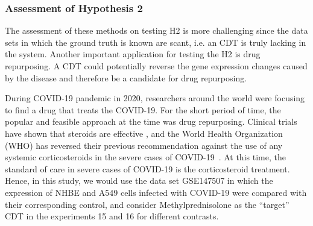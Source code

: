 \subsubsection{Assessment of Hypothesis 2}

The assessment of these methods on testing H2 is more challenging since the data sets in which the ground truth is known are scant, i.e. an CDT is truly lacking in the system. Another important application for testing the H2 is drug repurposing. A CDT could potentially reverse the  gene expression changes caused by the disease and therefore be a candidate for drug repurposing. 


During COVID-19 pandemic in 2020,  researchers around the world were focusing to find a drug that treats the COVID-19. For the short period of time, the popular and feasible approach at the time was drug repurposing. Clinical trials have shown that  steroids are effective \cite{meduri2020pharmacological, corral2021methylprednisolone,salton2020prolonged, meduri2020pharmacological, cochrane1996systemic, prescott2020corticosteroids}, and the World Health Organization (WHO) has reversed their previous recommendation against the use of any systemic corticosteroids in the severe cases of COVID-19~\cite{wilson2020covid}. At this time, the standard of care in severe cases of COVID-19 is the corticosteroid treatment. 
Hence, in this study, we would use the data set GSE147507 in which the expression of NHBE and A549 cells infected with COVID-19 were compared with their corresponding control, and consider Methylprednisolone as the ``target'' CDT in the experiments 15 and 16 for different contrasts. %

